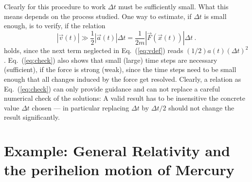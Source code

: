 \documentclass[12pt]{iopart}
\begin{document}
Clearly for this procedure to work $\Delta t$ must be sufficiently small. What this means depends on the process
studied. One way to estimate, if $\Delta t$ is small enough, is to verify, if the relation
\begin{equation}
|\vec v(t)| \gg \frac12|\vec a(t)|\Delta t = \frac{1}{2m} |\vec F(\vec x(t)) |\Delta t\ . 
\label{eq:check}
\end{equation}
holds, since the next term neglected in Eq.~(\ref{eq:vdef}) reads $(1/2)a(t)(\Delta t)^2$.  Eq.~({\ref{eq:check}})
also shows that small (large) time steps are necessary (sufficient), if the force is strong (weak), since
the time steps need to be small enough that all changes induced by the force get resolved. Clearly,
a relation as Eq.~({\ref{eq:check}}) can only provide guidance and can not replace a careful numerical check of
the solutions: A valid result has to be insensitive the concrete value $\Delta t$ chosen --- in particular replacing
$\Delta t$ by $\Delta t/2$ should not change the result significantly.



\section{Example: General Relativity and the perihelion motion of Mercury}\label{sec:gr}
\end{document}
